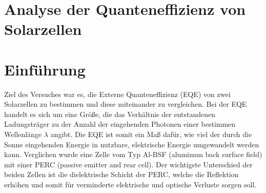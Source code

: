 \documentclass[ngerman, twocolumn]{scrartcl}
\begin{document}
\section*{Analyse der Quanteneffizienz von Solarzellen}
\section{Einführung}
Ziel des Versuches war es, die Externe Quanteneffizienz (EQE) von zwei Solarzellen zu bestimmen und diese miteinander zu vergleichen. Bei der EQE handelt es sich um eine Größe, die das Verhältnis der entstandenen Ladungsträger zu der Anzahl der eingehenden Photonen einer bestimmen Wellenlänge $\lambda$ angibt. Die EQE ist somit ein Maß dafür, wie viel der durch die Sonne eingehenden Energie in nutzbare, elektrische Energie umgewandelt werden kann. Verglichen wurde eine Zelle vom Typ Al-BSF (aluminum back surface field) mit einer PERC (passive emitter and rear cell). Der wichtigste Unterschied der beiden Zellen ist die dielektrische Schicht der PERC, welche die Reflektion erhöhen und somit für verminderte elektrische und optische Verluste sorgen soll.
\end{document}
